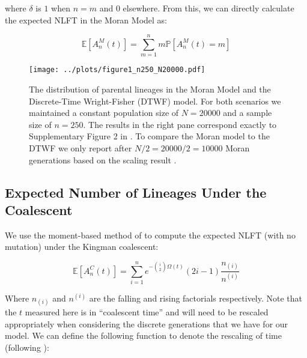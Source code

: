 \documentclass[11pt, twocolumn]{article}
\begin{document}
where $\delta$ is $1$ when $n = m$ and $0$ elsewhere. From this, we can directly calculate the expected NLFT in the Moran Model as:

 \begin{equation}
	 \mathbb{E}[A^M_n(t)] = \sum^n_{m=1} m \mathbb{P}[A^M_n (t) = m]
 \end{equation}

\begin{wrapfigure}{L}{0.5\textwidth}
	\begin{center}
	\texttt{[image: ../plots/figure1\_n250\_N20000.pdf]}
	\caption{The distribution of parental lineages in the Moran Model and the Discrete-Time Wright-Fisher (DTWF) model. For both scenarios we maintained a constant population size of $N = 20000$ and a sample size of $n=250$. The results in the right pane correspond exactly to Supplementary Figure 2 in \citet{Bhaskar2014}. To compare the Moran model to the DTWF we only report after $N/2 = 20000/2 = 10000$ Moran generations based on the scaling result \citep{Wakeley2008}.}
	\end{center}
\end{wrapfigure}


\subsection*{Expected Number of Lineages Under the Coalescent}

We use the moment-based method of \citet{Tavare1984} to compute the expected NLFT (with no mutation) under the Kingman coalescent:

\begin{equation}
	\mathbb{E}[A^C_n(t)] = \sum^n_{i=1} e^{-\binom{i}{2}\Omega(t)} (2i - 1) \frac{n_{(i)}}{n^{(i)}} 
\end{equation}


Where $n_{(i)}$ and $n^{(i)}$ are the falling and rising factorials respectively. Note that the $t$ measured here is in ``coalescent time'' and will need to be rescaled appropriately when considering the discrete generations that we have for our model. We can define the following function to denote the rescaling of time (following \citet{Bhaskar2014}):
\end{document}
